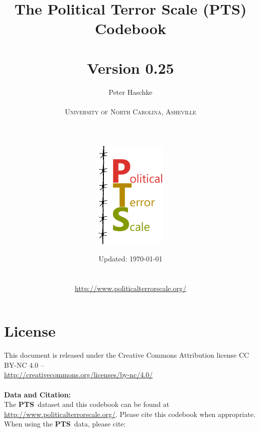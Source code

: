 \documentclass[11pt]{report}
\newcommand{\PTS}{\textsf{\textbf{PTS}}}
\begin{document}

\title{\Huge{The Political Terror Scale (\PTS) Codebook} \\~\\ \LARGE{Version 0.25}}
\author{Peter Haschke \\~\\ \textsc{University of North Carolina, Asheville} \\ 
~\\~\\~\\ \includegraphics[scale=1]{PTS-Logo.pdf}\\}
\date{\vspace{6.5cm} \small{Updated: \today \\~\\~\\ \href{http://www.politicalterrorscale.org/}{http://www.politicalterrorscale.org/}}}
\maketitle


\chapter*{\vspace{3.5cm} License}

This document is released under the Creative Commons Attribution license CC BY-NC 4.0 -- \ccbync \\ \href{http://creativecommons.org/licenses/by-nc/4.0/}{http://creativecommons.org/licenses/by-nc/4.0/}\\~\\

\noindent\textbf{\large{Data and Citation:}}\\

\noindent The \PTS~dataset and this codebook can be found at \href{http://www.politicalterrorscale.org/}{http://www.politicalterrorscale.org/}. Please cite this codebook when appropriate. When using the \PTS~data, please cite:\\
\end{document}
